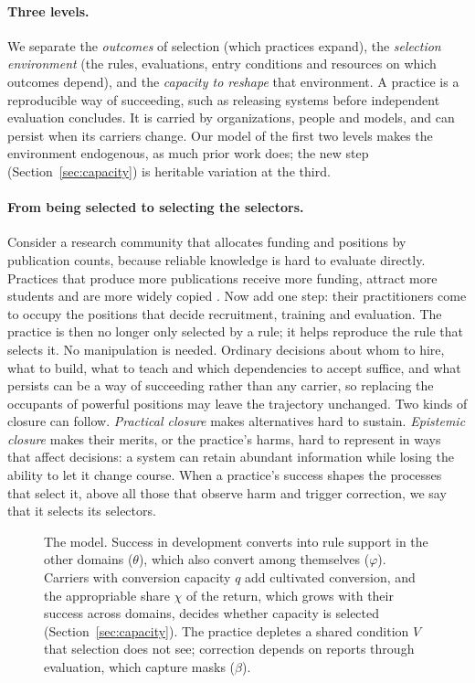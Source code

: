 \documentclass[letterpaper]{article} %
\theoremstyle{definition}
\begin{document}
\paragraph{Three levels.} We separate the \emph{outcomes} of selection (which practices expand), the \emph{selection environment} (the rules, evaluations, entry conditions and resources on which outcomes depend), and the \emph{capacity to reshape} that environment. A practice is a reproducible way of succeeding, such as releasing systems before independent evaluation concludes. It is carried by organizations, people and models, and can persist when its carriers change. Our model of the first two levels makes the environment endogenous, as much prior work does; the new step (Section~\ref{sec:capacity}) is heritable variation at the third.

\paragraph{From being selected to selecting the selectors.} Consider a research community that allocates funding and positions by publication counts, because reliable knowledge is hard to evaluate directly. Practices that produce more publications receive more funding, attract more students and are more widely copied \citep{smaldino2016}. Now add one step: their practitioners come to occupy the positions that decide recruitment, training and evaluation. The practice is then no longer only selected by a rule; it helps reproduce the rule that selects it. No manipulation is needed. Ordinary decisions about whom to hire, what to build, what to teach and which dependencies to accept suffice, and what persists can be a way of succeeding rather than any carrier, so replacing the occupants of powerful positions may leave the trajectory unchanged. Two kinds of closure can follow. \emph{Practical closure} makes alternatives hard to sustain. \emph{Epistemic closure} makes their merits, or the practice's harms, hard to represent in ways that affect decisions: a system can retain abundant information while losing the ability to let it change course. When a practice's success shapes the processes that select it, above all those that observe harm and trigger correction, we say that it selects its selectors.

\begin{figure}[t]
\centering

\caption{The model. Success in development converts into rule support in the other domains ($\theta$), which also convert among themselves ($\varphi$). Carriers with conversion capacity $q$ add cultivated conversion, and the appropriable share $\chi$ of the return, which grows with their success across domains, decides whether capacity is selected (Section~\ref{sec:capacity}). The practice depletes a shared condition $V$ that selection does not see; correction depends on reports through evaluation, which capture masks ($\beta$).}
\label{fig:schematic}
\end{figure}
\end{document}
